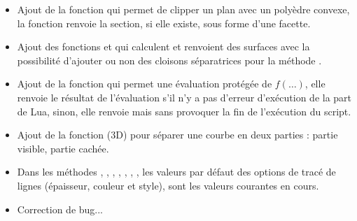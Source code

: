 \begin{itemize}
    \item Ajout de la fonction  qui permet de clipper un plan avec un polyèdre convexe, la fonction renvoie la section, si elle existe, sous forme d'une facette.
    \item Ajout des fonctions  et  qui calculent et renvoient des surfaces avec la possibilité d'ajouter ou non des cloisons séparatrices pour la méthode .
    \item Ajout de la fonction  qui permet une évaluation protégée de $f(\ldots)$, elle renvoie le résultat de l'évaluation s'il n'y a pas d'erreur d'exécution de la part de Lua, sinon, elle renvoie \nil mais sans provoquer la fin de l'exécution du script.
    \item Ajout de la fonction  (3D) pour séparer une courbe en deux parties : partie visible, partie cachée.
    \item Dans les méthodes , , , , , , , les valeurs par défaut des options de tracé de lignes (épaisseur, couleur et style), sont les valeurs courantes en cours.
    \item Correction de bug...    
\end{itemize}

